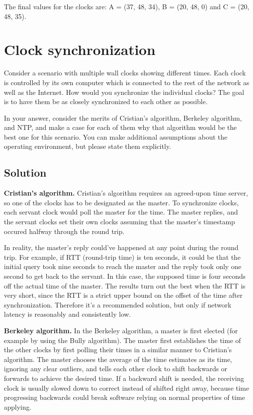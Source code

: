 \documentclass[12pt,a4paper,titlepage]{article}
\begin{document}
The final values for the clocks are: A = (37, 48, 34), B = (20, 48, 0) and C = (20, 48, 35).

\section{Clock synchronization}

Consider a scenario with multiple wall clocks showing different times. Each clock is controlled by its own computer which is connected to the rest of the network as well as the Internet. How would you synchronize the individual clocks? The goal is to have them be as closely synchronized to each other as possible.

In your answer, consider the merits of Cristian's algorithm, Berkeley algorithm, and NTP, and make a case for each of them why that algorithm would be the best one for this scenario. You can make additional assumptions about the operating environment, but please state them explicitly.

\subsection{Solution}

\textbf{Cristian's algorithm.} Cristian's algorithm requires an agreed-upon time server, so one of the clocks has to be designated as the master. To synchronize clocks, each servant clock would poll the master for the time. The master replies, and the servant clocks set their own clocks assuming that the master's timestamp occured halfway through the round trip.

In reality, the master's reply could've happened at any point during the round trip. For example, if RTT (round-trip time) is ten seconds, it could be that the initial query took nine seconds to reach the master and the reply took only one second to get back to the servant. In this case, the supposed time is four seconds off the actual time of the master. The results turn out the best when the RTT is very short, since the RTT is a strict upper bound on the offset of the time after synchronization. Therefore it's a recommended solution, but only if network latency is reasonably and consistently low.

\textbf{Berkeley algorithm.} In the Berkeley algorithm, a master is first elected (for example by using the Bully algorithm). The master first establishes the time of the other clocks by first polling their times in a similar manner to Cristian's algorithm. The master chooses the average of the time estimates as its time, ignoring any clear outliers, and tells each other clock to shift backwards or forwards to achieve the desired time. If a backward shift is needed, the receiving clock is usually slowed down to correct instead of shifted right away, because time progressing backwards could break software relying on normal properties of time applying.
\end{document}
